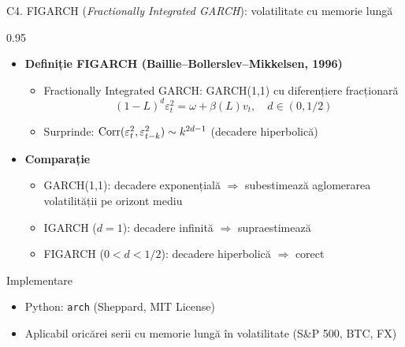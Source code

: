 \documentclass[9pt, aspectratio=169, t]{beamer}
\begin{document}
\begin{frame}[shrink=15]{C4. FIGARCH (\textit{Fractionally Integrated GARCH}): volatilitate cu memorie lungă}
\begin{cminipage}{0.95\textwidth}
\begin{itemize}\setlength{\itemsep}{1pt}
    \item \textbf{Definiție FIGARCH (Baillie--Bollerslev--Mikkelsen, 1996)}
    \begin{itemize}\setlength{\itemsep}{0pt}
        \item Fractionally Integrated GARCH: GARCH(1,1) cu diferențiere fracționară
        \[
            (1-L)^d\varepsilon_t^2=\omega+\beta(L)v_t,\quad d\in(0,1/2)
        \]
        \item Surprinde: $\text{Corr}(\varepsilon_t^2,\varepsilon_{t-k}^2)\sim k^{2d-1}$ (decadere hiperbolică)
    \end{itemize}
    \item \textbf{Comparație}
    \begin{itemize}\setlength{\itemsep}{0pt}
        \item GARCH(1,1): decadere exponențială $\Rightarrow$ subestimează aglomerarea volatilității pe orizont mediu
        \item IGARCH ($d=1$): decadere infinită $\Rightarrow$ supraestimează
        \item FIGARCH ($0<d<1/2$): decadere hiperbolică $\Rightarrow$ corect
    \end{itemize}
\end{itemize}
\begin{exampleblock}{Implementare}
\begin{itemize}\setlength{\itemsep}{0pt}
    \item Python: \texttt{arch} (Sheppard, MIT License)
    \item Aplicabil oricărei serii cu memorie lungă în volatilitate (S\&P 500, BTC, FX)
\end{itemize}
\end{exampleblock}
\end{cminipage}
\end{frame}
\end{document}
